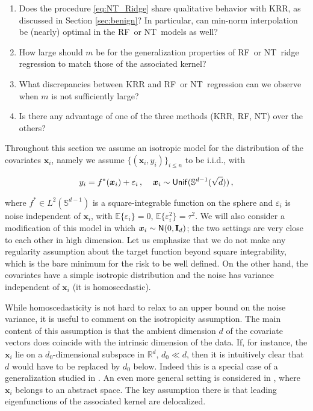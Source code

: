 \begin{enumerate}
\item[$(i)$] Does the procedure \eqref{eq:NT_Ridge}  share qualitative behavior with KRR, as discussed in Section \ref{sec:benign}? In particular, can min-norm interpolation be (nearly) optimal in the {\sf RF}\ or {\sf NT}\ models as well?
\item[$(ii)$] How large should $m$ be for the  generalization properties of {\sf RF}\ or {\sf NT}\ ridge regression to match those of  the associated kernel?
\item[$(iii)$] What discrepancies between KRR and {\sf RF}\ or {\sf NT}\ regression can we observe when $m$ is not sufficiently large?
\item[$(iv)$] Is there any advantage of one of the three methods (KRR, {\sf RF}, {\sf NT}) over the others?
\end{enumerate}

Throughout this section we assume an isotropic model for the distribution of the covariates ${\boldsymbol x}_i$, namely we assume $\{({\boldsymbol x}_i,y_i)\}_{i\le n}$ to be i.i.d., with 

\begin{align}
  y_i = f^*({\boldsymbol x}_i)+\varepsilon_i\, ,\;\;\;\; {\boldsymbol x}_i\sim{\sf Unif}({\mathbb S}^{d-1}(\sqrt{d}))\, ,
\end{align}

where $f^*\in L^2({\mathbb S}^{d-1})$ is a square-integrable function on the sphere and $\varepsilon_i$ is noise independent of
${\boldsymbol x}_i$, with $\mathbb{E}\{\varepsilon_i\}=0$, $\mathbb{E}\{\varepsilon_i^2\}=\tau^2$. We will also consider a modification of this model in which ${\boldsymbol x}_i\sim{\sf N}(0,{\mathbf I}_d)$; the two settings are very close to each other in high dimension. Let us emphasize that we do not make any regularity assumption about the target function beyond square integrability, which is the bare minimum for the risk to be well defined. On the other hand, the covariates have a simple isotropic distribution and the noise has  variance independent of ${\boldsymbol x}_i$ (it is homoscedastic).

While homoscedasticity is not hard to relax to an upper bound on the noise variance, it is useful to comment on the isotropicity assumption. The main content of this assumption is that the ambient dimension $d$ of the covariate vectors does coincide with the intrinsic dimension of the data. If, for instance, the ${\boldsymbol x}_i$ lie on a $d_0$-dimensional subspace in ${\mathbb R}^d$, $d_0\ll d$, then it is intuitively clear that $d$ would have to be replaced by $d_0$ below. Indeed this is a special case of a generalization studied in \cite{ghorbani2020neural}. An even more general setting is considered in \cite{mei2020generalization}, where ${\boldsymbol x}_i$ belongs to an abstract space. The key assumption there is that leading eigenfunctions of the associated kernel are delocalized.

